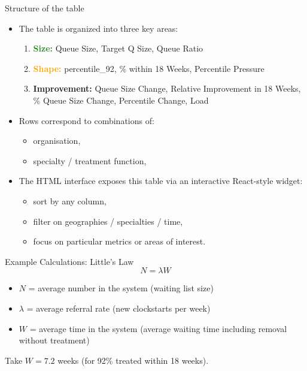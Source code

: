 \documentclass{beamer}
\let\oldtextbf\textbf
\renewcommand{\textbf}[1]{\textcolor{RoyalBlue}{\oldtextbf{#1}}}
\newcommand{\kwGreen}[1]{\textcolor{ForestGreen}{\oldtextbf{#1}}}
\newcommand{\kwRed}[1]{\textcolor{BrickRed}{\oldtextbf{#1}}}
\newcommand{\kwOrange}[1]{\textcolor{Orange}{\oldtextbf{#1}}}
\begin{document}
\begin{frame}{Structure of the table}
    \begin{itemize}
        \item The table is organized into three key areas:
            \begin{enumerate}
        \item \kwGreen{Size:} Queue Size, Target Q Size, Queue Ratio
        \item \kwOrange{Shape:} percentile\_92, \% within 18 Weeks, Percentile Pressure
        \item \kwRed{Improvement:} Queue Size Change, Relative Improvement in 18 Weeks, \% Queue Size Change, Percentile Change, Load
            \end{enumerate}
        \item Rows correspond to combinations of:
            \begin{itemize}
                \item organisation,
                \item specialty / treatment function,
            \end{itemize}
        \item The HTML interface exposes this table via an interactive
            React-style widget:
            \begin{itemize}
                \item sort by any column,
                \item filter on geographies / specialties / time,
                \item focus on particular metrics or areas of interest.
            \end{itemize}
    \end{itemize}
\end{frame}


\begin{frame}{Example Calculations: Little's Law}
 \[
 N = \lambda W 
 \]
  \begin{itemize}
      \item $N$ = average number in the system (waiting list size)
      \item $\lambda$ = average referral rate (new clockstarts per week)
      \item $W$ = average time in the system (average waiting time including removal without treatment)
    \end{itemize}
    \vspace{1em}
  Take $W = 7.2 $ weeks (for 92\% treated within 18 weeks). 

\end{frame}
\end{document}
